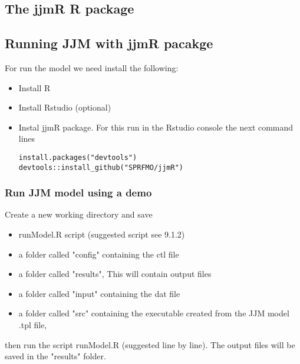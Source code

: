 \documentclass{article}
\begin{document}
\subsection{The jjmR R package}
\subsection{Running JJM with jjmR pacakge}

For run the model we need install the following:

\begin{itemize}
    \item Install R
    \item Install Rstudio (optional)
        \item Instal jjmR package. For this run in the Rstudio console the next command lines
    \begin{lstlisting}
install.packages("devtools")
devtools::install_github("SPRFMO/jjmR")
    \end{lstlisting}
\end{itemize}
\subsubsection{Run JJM model using a demo}
Create a new working directory and save  
\begin{itemize}
    \item runModel.R script (suggested script see 9.1.2)
    \item a folder called "config" containing the ctl file
    \item a folder called "results", This will contain output files
    \item a folder called "input" containing the dat file
    \item a folder called "src" containing the executable created from the JJM model .tpl file,
\end{itemize}
then run the script runModel.R (suggested line by line). The output files will be saved in the "results" folder.
\end{document}
